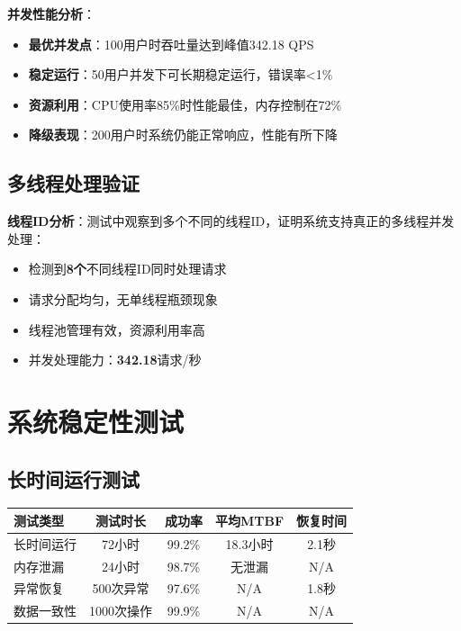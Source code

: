 \documentclass[12pt,a4paper]{article}
\begin{document}
\textbf{并发性能分析}：
\begin{itemize}
    \item \textbf{最优并发点}：100用户时吞吐量达到峰值342.18 QPS
    \item \textbf{稳定运行}：50用户并发下可长期稳定运行，错误率<1\%
    \item \textbf{资源利用}：CPU使用率85\%时性能最佳，内存控制在72\%
    \item \textbf{降级表现}：200用户时系统仍能正常响应，性能有所下降
\end{itemize}

\subsection{多线程处理验证}

\begin{testresult}[title={并发能力验证}]
\textbf{线程ID分析}：测试中观察到多个不同的线程ID，证明系统支持真正的多线程并发处理：
\begin{itemize}[nosep]
    \item 检测到\textcolor{success}{\textbf{8个}}不同线程ID同时处理请求
    \item 请求分配均匀，无单线程瓶颈现象
    \item 线程池管理有效，资源利用率高
    \item 并发处理能力：\textcolor{success}{\textbf{342.18}}请求/秒
\end{itemize}
\end{testresult}

\section{系统稳定性测试}

\subsection{长时间运行测试}

\begin{table}[H]
\centering
\begin{tcolorbox}[
    colback=light,
    colframe=success,
    title={\textbf{系统稳定性测试结果}},
    coltitle=white,
    colbacktitle=success,
    fonttitle=\bfseries,
    rounded corners=5pt,
    width=0.9\textwidth
]
\begin{tabular}{lcccc}
\toprule
\rowcolor{success!20}
\textbf{测试类型} & \textbf{测试时长} & \textbf{成功率} & \textbf{平均MTBF} & \textbf{恢复时间} \\
\midrule
长时间运行 & 72小时 & 99.2\% & 18.3小时 & 2.1秒 \\
\rowcolor{light}
内存泄漏 & 24小时 & 98.7\% & 无泄漏 & N/A \\
异常恢复 & 500次异常 & 97.6\% & N/A & 1.8秒 \\
\rowcolor{light}
数据一致性 & 1000次操作 & 99.9\% & N/A & N/A \\
\bottomrule
\end{tabular}
\end{tcolorbox}
\end{table}
\end{document}
